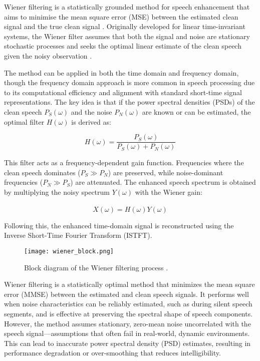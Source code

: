 Wiener filtering is a statistically grounded method for speech enhancement that aims to minimise the mean square error (MSE) between the estimated clean signal and the true clean signal \cite{loizou2013speech}. Originally developed for linear time-invariant systems, the Wiener filter assumes that both the signal and noise are stationary stochastic processes and seeks the optimal linear estimate of the clean speech given the noisy observation \cite{dubey2016evaluation}.

The method can be applied in both the time domain and frequency domain, though the frequency domain approach is more common in speech processing due to its computational efficiency and alignment with standard short-time signal representations. The key idea is that if the power spectral densities (PSDs) of the clean speech \(P_S(\omega)\) and the noise \(P_N(\omega)\) are known or can be estimated, the optimal filter \(H(\omega)\) is derived as:

\begin{equation}
    H(\omega) = \frac{P_S(\omega)}{P_S(\omega) + P_N(\omega)}
\end{equation}

This filter acts as a frequency-dependent gain function. Frequencies where the clean speech dominates (\(P_S \gg P_N\)) are preserved, while noise-dominant frequencies (\(P_N \gg P_S\)) are attenuated. The enhanced speech spectrum is obtained by multiplying the noisy spectrum \(Y(\omega)\) with the Wiener gain:

\begin{equation}
    \hat{X}(\omega) = H(\omega)Y(\omega)
\end{equation}

Following this, the enhanced time-domain signal is reconstructed using the Inverse Short-Time Fourier Transform (ISTFT).

\begin{figure}[h]
    \centering
    \texttt{[image: wiener\_block.png]}
    \caption{\label{fig:WienerBlock} Block diagram of the Wiener filtering process \cite{dubey2016evaluation}.}
\end{figure}

Wiener filtering is a statistically optimal method that minimizes the mean square error (MMSE) between the estimated and clean speech signals. It performs well when noise characteristics can be reliably estimated, such as during silent speech segments, and is effective at preserving the spectral shape of speech components. However, the method assumes stationary, zero-mean noise uncorrelated with the speech signal—assumptions that often fail in real-world, dynamic environments. This can lead to inaccurate power spectral density (PSD) estimates, resulting in performance degradation or over-smoothing that reduces intelligibility.

